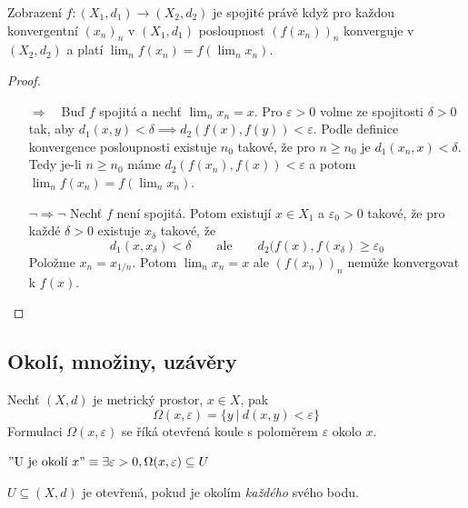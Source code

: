 \documentclass[../main.tex]{subfiles}
\begin{document}
\begin{theorem}
	Zobrazení $f: (X_1,d_1) \rightarrow (X_2,d_2)$ je spojité právě když pro každou konvergentní $(x_n)_n$ v $(X_1,d_1)$ 
	posloupnost $(f(x_n))_n$ konverguje v $(X_2,d_2)$ a platí $\lim_n f(x_n) = f(\lim_n x_n)$.
\end{theorem}

\begin{proof}
	\hfill %
	\begin{itemize}
		\item[$\Rightarrow \phantom{\lnot}$] Buď $f$ spojitá a nechť $\lim_nx_n = x$. Pro $\varepsilon > 0$ volme ze spojitosti $\delta > 0$
		tak, aby $d_1(x,y) <\delta \implies d_2(f(x),f(y)) <\varepsilon$.
		Podle definice konvergence posloupnosti existuje $n_0$ takové, že pro $n \ge n_0$ je $d_1(x_n,x) < \delta$. Tedy je-li $n \ge n_0$
		máme $d_2(f(x_n),f(x)) < \varepsilon$ a potom $\lim_n f(x_n) = f(\lim_n x_n)$.
		\item[$\lnot \Rightarrow  \lnot$] Nechť $f$ není spojitá.
		Potom existují $x \in X_1$ a $\varepsilon_0 > 0$ takové, že pro každé $\delta > 0$ existuje $x_\delta$ takové, že
		$$d_1(x, x_\delta) < \delta \qquad \text{ale} \qquad d_2(f(x), f(x_\delta) \ge \varepsilon_0$$
		Položme $x_n = x_{1/n}$. Potom $\lim_n x_n = x$ ale $(f(x_n))_n$ nemůže konvergovat k $f(x)$.
	\end{itemize}
\end{proof}



\subsection{Okolí, množiny, uzávěry}
\begin{definition}[Okolí]
	Nechť $(X,d)$ je metrický prostor, $x\in X$, pak
	$$\Omega (x,\varepsilon) = \{ y\ |\ d(x,y) < \varepsilon \}$$
	Formulaci $\Omega (x,\varepsilon)$ se říká otevřená koule s poloměrem $\varepsilon$ okolo $x$.
\end{definition}

\begin{example} 
	$"\textrm{U je okolí } x" \equiv \exists \varepsilon > 0, \Omega (x,\varepsilon) \subseteq U $
\end{example}

\begin{definition}
	$U \subseteq (X,d)$ je otevřená, pokud je okolím \textit{každého} svého bodu.
\end{definition}
\end{document}
